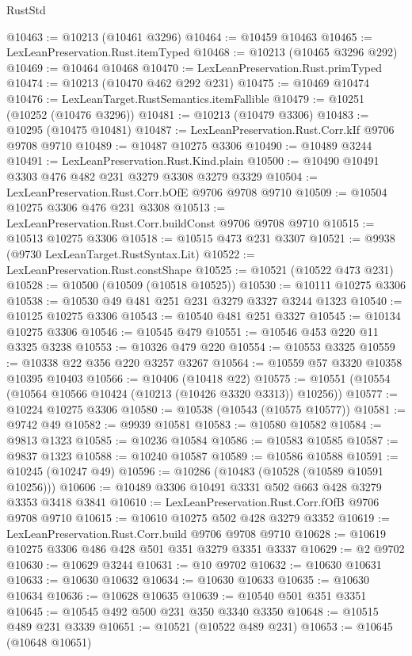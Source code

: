 \begin{lexlean}{RustStd}
\begin{coremodule}
{\begin{coremodule}
{{{{{{{{{{{{{{{{{{{{{{{{{{@10463 := @10213 (@10461 @3296)
@10464 := @10459 @10463
@10465 := LexLeanPreservation.Rust.itemTyped
@10468 := @10213 (@10465 @3296 @292)
@10469 := @10464 @10468
@10470 := LexLeanPreservation.Rust.primTyped
@10474 := @10213 (@10470 @462 @292 @231)
@10475 := @10469 @10474
@10476 := LexLeanTarget.RustSemantics.itemFallible
@10479 := @10251 (@10252 (@10476 @3296))
@10481 := @10213 (@10479 @3306)
@10483 := @10295 (@10475 @10481)
@10487 := LexLeanPreservation.Rust.Corr.kIf @9706 @9708 @9710
@10489 := @10487 @10275 @3306
@10490 := @10489 @3244
@10491 := LexLeanPreservation.Rust.Kind.plain
@10500 := @10490 @10491 @3303 @476 @482 @231 @3279 @3308 @3279 @3329
@10504 := LexLeanPreservation.Rust.Corr.bOfE @9706 @9708 @9710
@10509 := @10504 @10275 @3306 @476 @231 @3308
@10513 := LexLeanPreservation.Rust.Corr.buildConst @9706 @9708 @9710
@10515 := @10513 @10275 @3306
@10518 := @10515 @473 @231 @3307
@10521 := @9938 (@9730 LexLeanTarget.RustSyntax.Lit)
@10522 := LexLeanPreservation.Rust.constShape
@10525 := @10521 (@10522 @473 @231)
@10528 := @10500 (@10509 (@10518 @10525))
@10530 := @10111 @10275 @3306
@10538 := @10530 @49 @481 @251 @231 @3279 @3327 @3244 @1323
@10540 := @10125 @10275 @3306
@10543 := @10540 @481 @251 @3327
@10545 := @10134 @10275 @3306
@10546 := @10545 @479
@10551 := @10546 @453 @220 @11 @3325 @3238
@10553 := @10326 @479 @220
@10554 := @10553 @3325
@10559 := @10338 @22 @356 @220 @3257 @3267
@10564 := @10559 @57 @3320 @10358 @10395 @10403
@10566 := @10406 (@10418 @22)
@10575 := @10551 (@10554 (@10564 @10566 @10424 (@10213 (@10426 @3320 @3313)) @10256))
@10577 := @10224 @10275 @3306
@10580 := @10538 (@10543 (@10575 @10577))
@10581 := @9742 @49
@10582 := @9939 @10581
@10583 := @10580 @10582
@10584 := @9813 @1323
@10585 := @10236 @10584
@10586 := @10583 @10585
@10587 := @9837 @1323
@10588 := @10240 @10587
@10589 := @10586 @10588
@10591 := @10245 (@10247 @49)
@10596 := @10286 (@10483 (@10528 (@10589 @10591 @10256)))
@10606 := @10489 @3306 @10491 @3331 @502 @663 @428 @3279 @3353 @3418 @3841
@10610 := LexLeanPreservation.Rust.Corr.fOfB @9706 @9708 @9710
@10615 := @10610 @10275 @502 @428 @3279 @3352
@10619 := LexLeanPreservation.Rust.Corr.build @9706 @9708 @9710
@10628 := @10619 @10275 @3306 @486 @428 @501 @351 @3279 @3351 @3337
@10629 := @2 @9702
@10630 := @10629 @3244
@10631 := @10 @9702
@10632 := @10630 @10631
@10633 := @10630 @10632
@10634 := @10630 @10633
@10635 := @10630 @10634
@10636 := @10628 @10635
@10639 := @10540 @501 @351 @3351
@10645 := @10545 @492 @500 @231 @350 @3340 @3350
@10648 := @10515 @489 @231 @3339
@10651 := @10521 (@10522 @489 @231)
@10653 := @10645 (@10648 @10651)
}}}}}}}}}}}}}}}}}}}}}}}}}}
\end{coremodule}}
\end{coremodule}
\end{lexlean}
